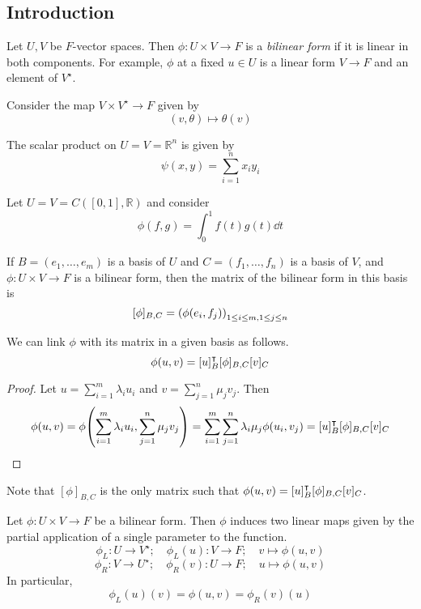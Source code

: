 \subsection{Introduction}
\begin{definition}
	Let \( U, V \) be \( F \)-vector spaces.
	Then \( \phi \colon U \times V \to F \) is a \textit{bilinear form} if it is linear in both components.
	For example, \( \phi \) at a fixed \( u \in U \) is a linear form \( V \to F \) and an element of \( V^\star \).
\end{definition}
\begin{example}
	Consider the map \( V \times V^\star \to F \) given by
	\[
		(v, \theta) \mapsto \theta(v)
	\]
\end{example}
\begin{example}
	The scalar product on \( U = V = \mathbb R^n \) is given by
	\[
		\psi(x, y) = \sum_{i=1}^n x_i y_i
	\]
\end{example}
\begin{example}
	Let \( U = V = C([0,1], \mathbb R) \) and consider
	\[
		\phi(f,g) = \int_0^1 f(t)g(t) \dd{t}
	\]
\end{example}
\begin{definition}
	If \( B = (e_1, \dots, e_m) \) is a basis of \( U \) and \( C = (f_1, \dots, f_n) \) is a basis of \( V \), and \( \phi \colon U \times V \to F \) is a bilinear form, then the matrix of the bilinear form in this basis is
	\[
		[\phi]_{B, C} = \qty( \phi(e_i, f_j) )_{1 \leq i \leq m, 1 \leq j \leq n}
	\]
\end{definition}
\begin{lemma}
	We can link \( \phi \) with its matrix in a given basis as follows.
	\[
		\phi(u,v) = [u]_B^\intercal [\phi]_{B, C} [v]_C
	\]
\end{lemma}
\begin{proof}
	Let \( u = \sum_{i=1}^m \lambda_i u_i \) and \( v = \sum_{j=1}^n \mu_j v_j \).
	Then
	\[
		\phi(u,v) = \phi\qty( \sum_{i=1}^m \lambda_i u_i, \sum_{j=1}^n \mu_j v_j ) = \sum_{i=1}^m \sum_{j=1}^n \lambda_i \mu_j \phi(u_i, v_j) = [u]_B^\intercal [\phi]_{B,C} [v]_C
	\]
\end{proof}
\begin{remark}
	Note that \( [\phi]_{B,C} \) is the only matrix such that \( \phi(u,v) = [u]_B^\intercal [\phi]_{B, C} [v]_C \).
\end{remark}
\begin{definition}
	Let \( \phi \colon U \times V \to F \) be a bilinear form.
	Then \( \phi \) induces two linear maps given by the partial application of a single parameter to the function.
	\[
		\phi_L \colon U \to V^\star;\quad \phi_L(u) \colon V \to F;\quad v \mapsto \phi(u,v)
	\]
	\[
		\phi_R \colon V \to U^\star;\quad \phi_R(v) \colon U \to F;\quad u \mapsto \phi(u,v)
	\]
	In particular,
	\[
		\phi_L(u)(v) = \phi(u,v) = \phi_R(v)(u)
	\]
\end{definition}
